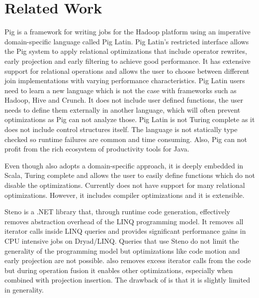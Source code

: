 \section{Related Work}
\label{sec:related-work}

Pig \cite{olston_pig_2008-1} is a framework for writing jobs for the Hadoop
platform using an imperative domain-specific language called Pig Latin. Pig
Latin's restricted interface allows the Pig system to apply relational
optimizations that include operator rewrites, early projection and early
filtering to achieve good performance.
It has extensive support for relational operations and allows the user to choose
between different join implementations with varying performance characteristics.
Pig Latin users need to learn a new language which is not the case with
frameworks such as Hadoop, Hive and Crunch. It does not include user defined
functions, the user needs to define them externally in another language, which
will often prevent optimizations as Pig can not analyze those. Pig Latin is not
Turing complete as it does not include control structures itself.
The language is not statically type checked so runtime failures are common and
time consuming. Also, Pig can not profit from the rich ecosystem
of productivity tools for Java.

Even though \tool also adopts a domain-specific approach, it is deeply embedded
in Scala, Turing complete and allows the user to easily define functions which
do not disable the optimizations. Currently \tool does not have support for many
relational optimizations. However, it includes compiler optimizations and it is
extensible.

Steno \cite{murray_steno:_2011} is a .NET library that, through runtime code
generation, effectively removes abstraction overhead of the LINQ programming
model. It removes all iterator calls inside LINQ queries and provides
significant performance gains in CPU intensive jobs on Dryad/LINQ. Queries that
use Steno do not limit the generality of the programming model but optimizations
like code motion and early projection are not possible.
\tool also removes excess iterator calls from the code but during operation
fusion it enables other optimizations, especially when combined with projection
insertion. The drawback of \tool is that it is slightly limited in generality.

